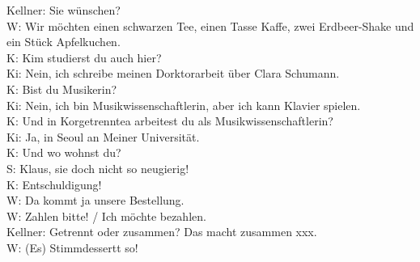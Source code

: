 Kellner: Sie wünschen? \\
W: Wir möchten einen schwarzen Tee, einen Tasse Kaffe, zwei Erdbeer-Shake und ein Stück Apfelkuchen. \\
K: Kim studierst du auch hier?  \\
Ki: Nein, ich schreibe meinen Dorktorarbeit über Clara Schumann. \\
K: Bist du Musikerin? \\
Ki: Nein, ich bin Musikwissenschaftlerin, aber ich kann Klavier spielen. \\
K: Und in Korgetrenntea arbeitest du als Musikwissenschaftlerin?  \\
Ki: Ja, in Seoul an Meiner Universität.  \\
K: Und wo wohnst du? \\
S: Klaus, sie doch nicht so neugierig!  \\
K: Entschuldigung! \\
W: Da kommt ja unsere Bestellung. \\
W: Zahlen bitte! / Ich möchte bezahlen. \\
Kellner: Getrennt oder zusammen? Das macht zusammen xxx.  \\
W: (Es) Stimmdessertt so!  \\


